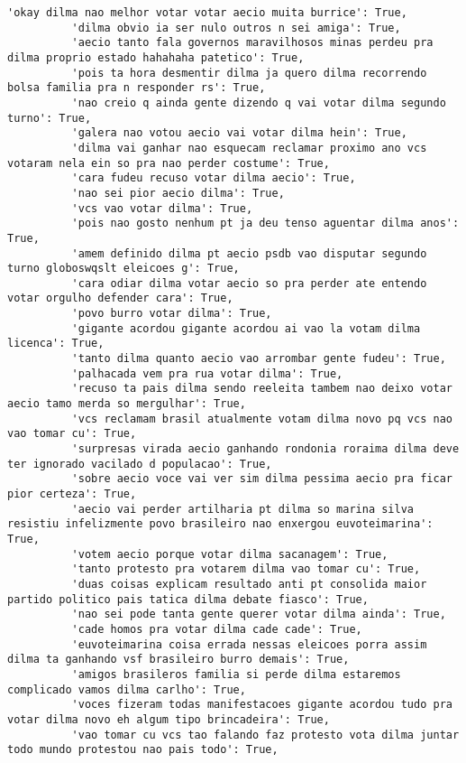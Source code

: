\documentclass[11pt]{article}
\begin{document}
\begin{Verbatim}[commandchars=\\\{\}]
          'okay dilma nao melhor votar votar aecio muita burrice': True,
          'dilma obvio ia ser nulo outros n sei amiga': True,
          'aecio tanto fala governos maravilhosos minas perdeu pra dilma proprio estado hahahaha patetico': True,
          'pois ta hora desmentir dilma ja quero dilma recorrendo bolsa familia pra n responder rs': True,
          'nao creio q ainda gente dizendo q vai votar dilma segundo turno': True,
          'galera nao votou aecio vai votar dilma hein': True,
          'dilma vai ganhar nao esquecam reclamar proximo ano vcs votaram nela ein so pra nao perder costume': True,
          'cara fudeu recuso votar dilma aecio': True,
          'nao sei pior aecio dilma': True,
          'vcs vao votar dilma': True,
          'pois nao gosto nenhum pt ja deu tenso aguentar dilma anos': True,
          'amem definido dilma pt aecio psdb vao disputar segundo turno globoswqslt eleicoes g': True,
          'cara odiar dilma votar aecio so pra perder ate entendo votar orgulho defender cara': True,
          'povo burro votar dilma': True,
          'gigante acordou gigante acordou ai vao la votam dilma licenca': True,
          'tanto dilma quanto aecio vao arrombar gente fudeu': True,
          'palhacada vem pra rua votar dilma': True,
          'recuso ta pais dilma sendo reeleita tambem nao deixo votar aecio tamo merda so mergulhar': True,
          'vcs reclamam brasil atualmente votam dilma novo pq vcs nao vao tomar cu': True,
          'surpresas virada aecio ganhando rondonia roraima dilma deve ter ignorado vacilado d populacao': True,
          'sobre aecio voce vai ver sim dilma pessima aecio pra ficar pior certeza': True,
          'aecio vai perder artilharia pt dilma so marina silva resistiu infelizmente povo brasileiro nao enxergou euvoteimarina': True,
          'votem aecio porque votar dilma sacanagem': True,
          'tanto protesto pra votarem dilma vao tomar cu': True,
          'duas coisas explicam resultado anti pt consolida maior partido politico pais tatica dilma debate fiasco': True,
          'nao sei pode tanta gente querer votar dilma ainda': True,
          'cade homos pra votar dilma cade cade': True,
          'euvoteimarina coisa errada nessas eleicoes porra assim dilma ta ganhando vsf brasileiro burro demais': True,
          'amigos brasileros familia si perde dilma estaremos complicado vamos dilma carlho': True,
          'voces fizeram todas manifestacoes gigante acordou tudo pra votar dilma novo eh algum tipo brincadeira': True,
          'vao tomar cu vcs tao falando faz protesto vota dilma juntar todo mundo protestou nao pais todo': True,

\end{Verbatim}
\end{document}

